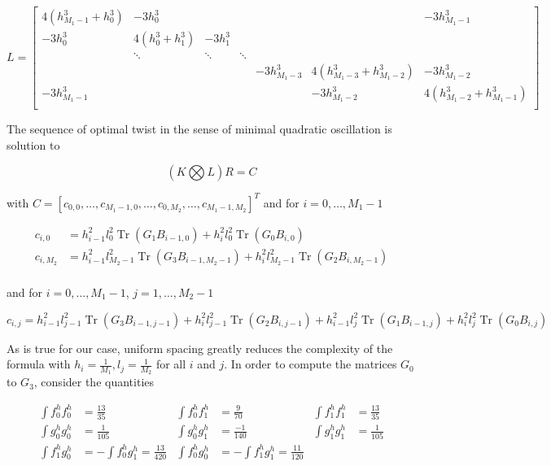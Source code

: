 \documentclass[a4paper, 11pt]{article}
\DeclareMathOperator*{\Tr}{Tr}
\begin{document}
\begin{equation}
  \label{eq:L}
  L = \begin{bmatrix}
    4(h_{M_1-1}^3 + h_0^3) & -3 h_0^3 & & & & & -3h_{M_1-1}^3 \\
    -3h_0^3 & 4(h_0^3 + h_1^3) & -3h_1^3 & & & & \\
    & \ddots & \ddots & \ddots & & & \\
    & & & & -3h_{M_1-3}^3 & 4 (h_{M_1-3}^3 + h_{M_1-2}^3) & -3 h_{M_1-2}^3 \\
    -3h_{M_1-1}^3 & & & & & -3h_{M_1-2}^3 & 4 (h_{M_1-2}^3 + h_{M_1-1}^3) \\
  \end{bmatrix}
\end{equation}

The sequence of optimal twist in the sense of minimal quadratic oscillation is solution to 

\begin{equation}
  (K \bigotimes L) R = C
\end{equation}

with $C = {[c_{0, 0}, \ldots, c_{M_1-1, 0}, \ldots, c_{0, M_2}, \ldots ,c_{M_1-1, M_2}]}^T$ and for $i=0, \ldots, M_1-1$

\begin{align*}
  c_{i,0} &= h_{i-1}^2 l_0^2 \Tr \left(G_1 B_{i-1, 0}\right) + h_{i}^2 l_0^2 \Tr \left(G_0 B_{i, 0}\right) \\
  c_{i,M_2} &= h_{i-1}^2 l_{M_2-1}^2 \Tr \left(G_3 B_{i-1, M_2-1}\right) + h_{i}^2 l_{M_2-1}^2 \Tr \left(G_2 B_{i, 
  M_2-1}\right) \\
\end{align*}

and for $i=0, \ldots, M_1-1$, $j=1, \ldots, M_2-1$

\begin{equation*}
  c_{i,j} = h_{i-1}^2 l_{j-1}^2 \Tr \left(G_3 B_{i-1, j-1}\right) + h_{i}^2 l_{j-1}^2 \Tr \left(G_2 B_{i, j-1}\right) + 
  h_{i-1}^2 l_{j}^2 \Tr \left(G_1 B_{i-1, j}\right) + h_{i}^2 l_{j}^2 \Tr \left(G_0 B_{i, j}\right)
\end{equation*}


As is true for our case, uniform spacing greatly reduces the complexity of the formula with $h_i = \frac{1}{M_1}, l_j = 
\frac{1}{M_2}$ for all $i$ and $j$. In order to compute the matrices $G_0$ to $G_3$, consider the quantities

\begin{align*}
  \int f_0^h f_0^h &= \frac{13}{35} & \int f_0^h f_1^h &= \frac{9}{70} & \int f_1^h f_1^h &= \frac{13}{35} \\
  \int g_0^h g_0^h &= \frac{1}{105} & \int g_0^h g_1^h &= \frac{-1}{140} & \int g_1^h g_1^h &= \frac{1}{105} \\
  \int f_1^h g_0^h &= - \int f_0^h g_1^h = \frac{13}{420} & \int f_0^h g_0^h &= - \int f_1^h g_1^h = \frac{11}{120}
\end{align*}
\end{document}
